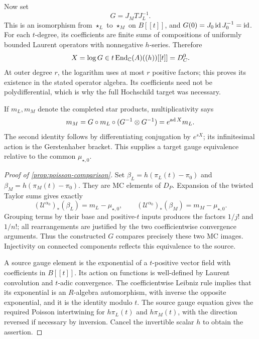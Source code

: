 Now set
\[
 G=J_M T J_L^{-1}.
\]
This is an isomorphism from $\star_L$ to $\star_M$ on $B[[t]]$, and
$G(0)=J_0\operatorname{id} J_0^{-1}=\operatorname{id}$.  For each $t$-degree, its coefficients
are finite sums of compositions of uniformly bounded Laurent
operators with nonnegative $h$-series.  Therefore
\[
 X=\log G\in t\operatorname{End}_{\mathbb C}(A)((h))[[t]]=D_C^0.
\]
At outer degree $r$, the logarithm uses at most $r$ positive factors;
this proves its existence in the stated operator algebra.  Its
coefficients need not be polydifferential, which is why the full
Hochschild target was necessary.

If $m_L,m_M$ denote the completed star products, multiplicativity
says
\[
 m_M=G\circ m_L\circ(G^{-1}\otimes G^{-1})
      =e^{\operatorname{ad} X}m_L.
\]
The second identity follows by differentiating conjugation by
$e^{sX}$; its infinitesimal action is the Gerstenhaber bracket.
This supplies a target gauge equivalence relative to the common $\mu_{\star,0}$.

\begin{proof}[Proof of \cref{prop:poisson-comparison}]
Set $\beta_L=h(\pi_L(t)-\pi_0)$ and
$\beta_M=h(\pi_M(t)-\pi_0)$.  They are MC elements of
$D_P$.  Expansion of the twisted Taylor sums gives exactly
\[
 (\mathcal U^{\alpha_0})_*(\beta_L)=m_L-\mu_{\star,0},
 \qquad
 (\mathcal U^{\alpha_0})_*(\beta_M)=m_M-\mu_{\star,0}.
\]
Grouping terms by their base and positive-$t$ inputs produces the
factors $1/j!$ and $1/n!$; all rearrangements are justified by the
two coefficientwise convergence arguments.  Thus the constructed
$G$ compares precisely these two MC images.  Injectivity on connected
components reflects this equivalence to the source.

A source gauge element is the exponential of a $t$-positive vector
field with coefficients in $B[[t]]$.  Its action on functions is
well-defined by Laurent convolution and $t$-adic convergence.
The coefficientwise Leibniz rule implies that its exponential is
an $R$-algebra automorphism, with inverse the opposite exponential,
and it is the identity modulo $t$.  The source gauge equation gives
the required Poisson intertwining for $h\pi_L(t)$ and
$h\pi_M(t)$, with the direction reversed if necessary by inversion.
Cancel the invertible scalar $h$ to obtain the assertion.
\end{proof}
